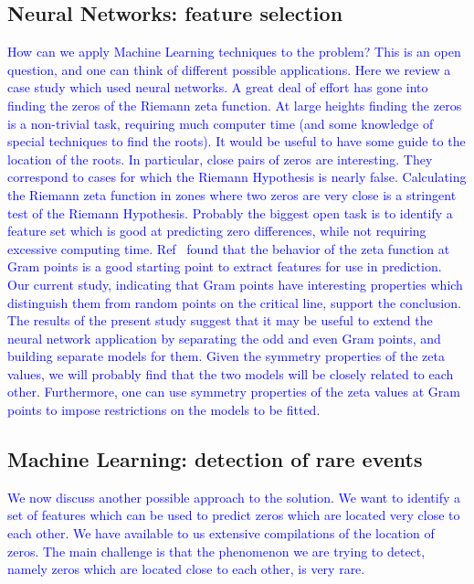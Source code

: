 \documentclass[twoside]{article}
\theoremstyle{definition}
\begin{document}
\subsection{\label{secfeature}Neural Networks: feature selection}
 \textcolor{blue}{ 
How can we apply Machine Learning techniques to the problem? This is an open question, and one can think of different possible applications. Here we review a case study which used neural networks. A great deal of effort has gone into finding the zeros of the Riemann zeta function. At large heights finding the zeros is a non-trivial task, requiring much computer time (and some knowledge of special techniques to find the roots). It would be useful to have some guide to the location of the roots. In particular, close pairs of zeros are interesting. They correspond to cases for which the
Riemann Hypothesis is nearly false. Calculating the Riemann zeta function in zones where
two zeros are very close is a stringent test of the Riemann Hypothesis. Probably the biggest open task is to identify a feature set which is good at predicting zero differences, while not requiring excessive computing time. Ref~\cite{osneural} found that the behavior of the zeta function at Gram points is a good starting point to extract features for use in prediction. Our current study, indicating that Gram points have interesting properties which distinguish them from random points on the critical line, support the conclusion. The results of the present study suggest that it may be useful to extend the neural network application by separating the odd and even Gram points, and building separate models for them. Given the symmetry properties of the zeta values, we will probably find that the two models will be closely related to each other.  Furthermore, one can use symmetry properties of the zeta values at Gram points to impose restrictions on the models to be fitted.  
}

\subsection{\label{secMLrare}Machine Learning: detection of rare events}

 \textcolor{blue}{ 
We now discuss another possible approach to the solution. We want to identify a set of features which can be used  to predict zeros which are located very close to each other. We have available to us extensive compilations of the location of zeros. The main challenge is that the phenomenon we are trying to detect, namely zeros which are located close to each other, is very rare. 
}
\end{document}
